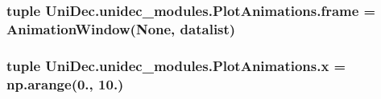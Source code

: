 \subsubsection[{frame}]{\setlength{\rightskip}{0pt plus 5cm}tuple Uni\+Dec.\+unidec\+\_\+modules.\+Plot\+Animations.\+frame = {\bf Animation\+Window}(None, {\bf datalist})}\label{namespace_uni_dec_1_1unidec__modules_1_1_plot_animations_adb3974654657a7b5555b5f9beca81bc0}
\hypertarget{namespace_uni_dec_1_1unidec__modules_1_1_plot_animations_ae72945ace7d5e20427b475903ce79975}{}
\subsubsection[{x}]{\setlength{\rightskip}{0pt plus 5cm}tuple Uni\+Dec.\+unidec\+\_\+modules.\+Plot\+Animations.\+x = np.\+arange(0., 10.)}\label{namespace_uni_dec_1_1unidec__modules_1_1_plot_animations_ae72945ace7d5e20427b475903ce79975}
